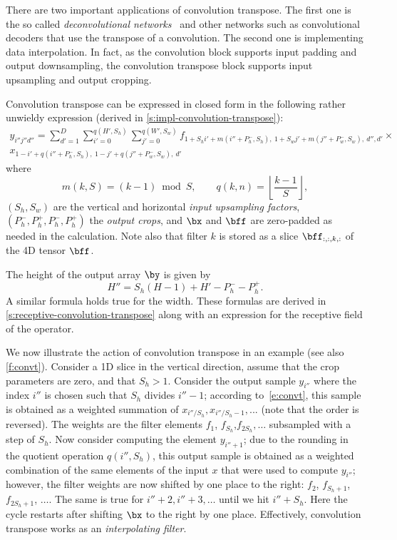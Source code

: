There are two important applications of convolution transpose. The first one is the so called \emph{deconvolutional networks}~\cite{zeiler14visualizing} and other networks such as convolutional decoders that use the transpose of a convolution. The second one is implementing data interpolation. In fact, as the convolution block supports input padding and output downsampling, the convolution transpose block supports input upsampling and output cropping.

Convolution transpose can be expressed in closed form in the following rather unwieldy expression (derived in \cref{s:impl-convolution-transpose}):
\begin{multline}\label{e:convt}
y_{i''j''d''} =
 \sum_{d'=1}^{D}
 \sum_{i'=0}^{q(H',S_h)}
 \sum_{j'=0}^{q(W',S_w)}
f_{
1+ S_hi' + m(i''+ P_h^-, S_h),\ %
1+ S_wj' + m(j''+ P_w^-, S_w),\ %
d'',
d'
}
\times \\
x_{
1 - i' + q(i''+P_h^-,S_h),\ %
1 - j' + q(j''+P_w^-,S_w),\ %
d'
}
\end{multline}
where
\[
m(k,S) = (k - 1) \bmod S,
\qquad
q(k,n) = \left\lfloor \frac{k-1}{S} \right\rfloor,
\]
$(S_h,S_w)$ are the vertical and horizontal \emph{input upsampling factors},  $(P_h^-,P_h^+,P_h^-,P_h^+)$ the \emph{output crops}, and $\bx$ and $\bff$ are zero-padded as needed in the calculation. Note also that filter $k$ is stored as a slice $\bff_{:,:,k,:}$ of the 4D tensor $\bff$.

The height of the output array $\by$ is given by
\[
  H'' = S_h (H - 1) + H' -P^-_h - P^+_h.
\]
A similar formula holds true for the width. These formulas are derived in \cref{s:receptive-convolution-transpose} along with an expression for the receptive field of the operator.

We now illustrate the action of convolution transpose in an example (see also \cref{f:convt}).  Consider a 1D slice in the vertical direction, assume that the crop parameters are zero, and that $S_h>1$. Consider the output sample $y_{i''}$ where the index $i''$ is chosen such that $S_h$ divides $i''-1$; according to~\eqref{e:convt}, this sample is obtained as a weighted summation of $x_{i'' / S_h},x_{i''/S_h-1},...$ (note that the order is reversed). The weights are the filter elements $f_1$, $f_{S_h}$,$f_{2S_h},\dots$ subsampled with a step of $S_h$. Now consider computing the element $y_{i''+1}$; due to the rounding in the quotient operation $q(i'',S_h)$, this output sample is obtained as a weighted combination of the same elements of the input $x$ that were used to compute $y_{i''}$; however, the filter weights are now shifted by one place to the right: $f_2$, $f_{S_h+1}$,$f_{2S_h+1}$, $\dots$. The same is true for $i''+2, i'' + 3,\dots$ until we hit $i'' + S_h$. Here the cycle restarts after shifting $\bx$ to the right by one place. Effectively, convolution transpose works as an \emph{interpolating filter}.

